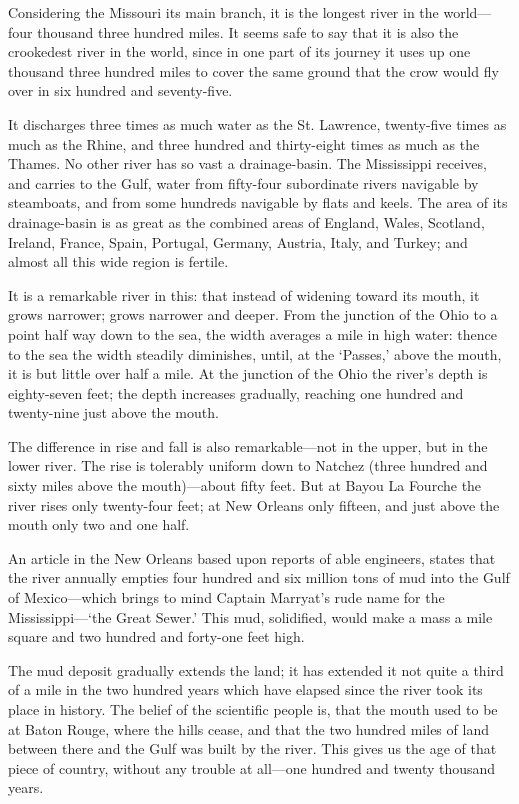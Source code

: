 \documentclass[../../../demo.tex]{novelettesubdoc}
\begin{document}

Considering the Missouri its main branch, it is the longest river in the
world---four thousand three hundred miles. It seems safe to say that it is
also the crookedest river in the world, since in one part of its journey
it uses up one thousand three hundred miles to cover the same ground that the
crow would fly over in six hundred and seventy-five.

It discharges three times as much water as the St. Lawrence, twenty-five times
as much as the Rhine, and three hundred and thirty-eight times as much as the
Thames. No other river has so vast a drainage-basin. The
Mississippi receives, and carries to the Gulf, water from
fifty-four subordinate rivers navigable by steamboats,
and from some hundreds navigable by flats and keels.
The area of its drainage-basin is as great as the combined areas of England,
Wales, Scotland, Ireland, France, Spain, Portugal, Germany, Austria, Italy,
and Turkey; and almost all this wide region is fertile.

It is a remarkable river in this: that instead of widening toward its
mouth, it grows narrower; grows narrower and deeper. From the junction
of the Ohio to a point half way down to the sea, the width averages a
mile in high water: thence to the sea the width steadily diminishes,
until, at the `Passes,' above the mouth, it is but little over half
a mile. At the junction of the Ohio the river's depth is
eighty-seven feet; the depth increases gradually, reaching one hundred
and twenty-nine just above the mouth.

The difference in rise and fall is also remarkable---not in the upper,
but in the lower river. The rise is tolerably uniform down to Natchez
(three hundred and sixty miles above the mouth)---about fifty feet.
But at Bayou La Fourche the river rises only twenty-four feet; at New
Orleans only fifteen, and just above the mouth only two and one half.

An article in the New Orleans   based upon reports of
able engineers, states that the river annually empties four hundred and
six million tons of mud into the Gulf of Mexico---which brings to mind
Captain Marryat's rude name for the Mississippi---`the Great Sewer.' This
mud, solidified, would make a mass a mile square and two hundred and
forty-one feet high.

The mud deposit gradually extends the land; it has
extended it not quite a third of a mile in the two hundred years which
have elapsed since the river took its place in history. The belief of
the scientific people is, that the mouth used to be at Baton Rouge,
where the hills cease, and that the two hundred miles of land between
there and the Gulf was built by the river. This gives us the age of that
piece of country, without any trouble at all---one hundred and twenty
thousand years.
\end{document}
